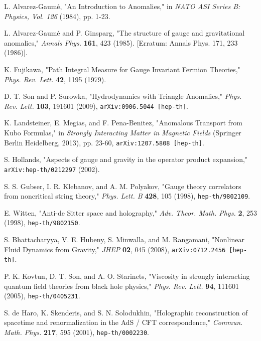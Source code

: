 \documentclass[11pt, letterpaper]{report}
\theoremstyle{plain} %
\theoremstyle{definition} %
\theoremstyle{remark} %
\begin{document}
\begin{thebibliography}{99}
L. Alvarez-Gaumé, "An Introduction to Anomalies," in \textit{NATO ASI Series B: Physics, Vol. 126} (1984), pp. 1-23.

L. Alvarez-Gaumé and P. Ginsparg, "The structure of gauge and gravitational anomalies," \textit{Annals Phys.} \textbf{161}, 423 (1985). [Erratum: Annals Phys. 171, 233 (1986)].

K. Fujikawa, "Path Integral Measure for Gauge Invariant Fermion Theories," \textit{Phys. Rev. Lett.} \textbf{42}, 1195 (1979).

D. T. Son and P. Surowka, "Hydrodynamics with Triangle Anomalies," \textit{Phys. Rev. Lett.} \textbf{103}, 191601 (2009), \texttt{arXiv:0906.5044 [hep-th]}.

K. Landsteiner, E. Megias, and F. Pena-Benitez, "Anomalous Transport from Kubo Formulas," in \textit{Strongly Interacting Matter in Magnetic Fields} (Springer Berlin Heidelberg, 2013), pp. 23-60, \texttt{arXiv:1207.5808 [hep-th]}.

\label{Hollands2002Aspects}
S. Hollands, "Aspects of gauge and gravity in the operator product expansion," \texttt{arXiv:hep-th/0212297} (2002).

S. S. Gubser, I. R. Klebanov, and A. M. Polyakov, "Gauge theory correlators from noncritical string theory," \textit{Phys. Lett. B} \textbf{428}, 105 (1998), \texttt{hep-th/9802109}.

E. Witten, "Anti-de Sitter space and holography," \textit{Adv. Theor. Math. Phys.} \textbf{2}, 253 (1998), \texttt{hep-th/9802150}.

S. Bhattacharyya, V. E. Hubeny, S. Minwalla, and M. Rangamani, "Nonlinear Fluid Dynamics from Gravity," \textit{JHEP} \textbf{02}, 045 (2008), \texttt{arXiv:0712.2456 [hep-th]}.

P. K. Kovtun, D. T. Son, and A. O. Starinets, "Viscosity in strongly interacting quantum field theories from black hole physics," \textit{Phys. Rev. Lett.} \textbf{94}, 111601 (2005), \texttt{hep-th/0405231}.

S. de Haro, K. Skenderis, and S. N. Solodukhin, "Holographic reconstruction of spacetime and renormalization in the AdS / CFT correspondence," \textit{Commun. Math. Phys.} \textbf{217}, 595 (2001), \texttt{hep-th/0002230}.


\end{thebibliography}
\end{document}
